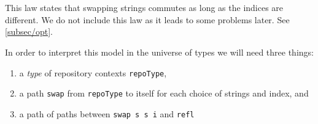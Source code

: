\begin{code}%
\>[0][@{}l@{\AgdaIndent{1}}]%
\>[2]%
\>[175I]\AgdaSymbol{:}%
\>[176I]\AgdaSymbol{(}\AgdaSpace{}%
\AgdaSpace{}%
\AgdaSpace{}%
\AgdaSpace{}%
\AgdaSymbol{:}\AgdaSpace{}%
\AgdaSymbol{)}\AgdaSpace{}%
\AgdaSymbol{(}\AgdaSpace{}%
\AgdaSpace{}%
\AgdaSymbol{:}\AgdaSpace{}%
\AgdaSpace{}%
\AgdaSymbol{)}\AgdaSpace{}%
\AgdaSpace{}%
\AgdaSymbol{(}\AgdaSpace{}%
\AgdaSpace{}%
\AgdaSymbol{)}\AgdaSpace{}%
\<%
\\
\>[.][@{}l@{}]\<[176I]%
\>[10]\AgdaSymbol{(}\AgdaSpace{}%
\AgdaSpace{}%
\AgdaSpace{}%
\AgdaSpace{}%
\AgdaSymbol{)}\AgdaSpace{}%
\AgdaSpace{}%
\AgdaSymbol{(}\AgdaSpace{}%
\AgdaSpace{}%
\AgdaSpace{}%
\AgdaSpace{}%
\AgdaSymbol{)}\<%
\\
\>[.][@{}l@{}]\<[175I]%
\>[8]\AgdaSpace{}%
\AgdaSymbol{(}\AgdaSpace{}%
\AgdaSpace{}%
\AgdaSpace{}%
\AgdaSpace{}%
\AgdaSymbol{)}\AgdaSpace{}%
\AgdaSpace{}%
\AgdaSymbol{(}\AgdaSpace{}%
\AgdaSpace{}%
\AgdaSpace{}%
\AgdaSpace{}%
\AgdaSymbol{)}\<%
\end{code}

This law states that swapping strings commutes as long as the indices are different.
We do not include this law as it leads to some problems later. See \autoref{subsec/opt}.

In order to interpret this model in the universe of types we will need three things:
\begin{enumerate}
  \item a \emph{type} of repository contexts \texttt{repoType},
  \item a path \texttt{swap} from \texttt{repoType} to itself for
        each choice of strings and index, and
  \item a path of paths between \texttt{swap s s i} and \texttt{refl}
\end{enumerate}

